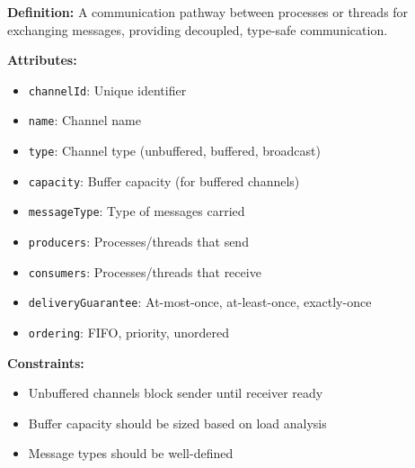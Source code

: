 \documentclass[11pt,letterpaper]{article}
\begin{document}
\begin{definitionbox}
\textbf{Definition:} A communication pathway between processes or threads for exchanging messages, providing decoupled, type-safe communication.

\textbf{Attributes:}
\begin{itemize}[nosep]
    \item \texttt{channelId}: Unique identifier
    \item \texttt{name}: Channel name
    \item \texttt{type}: Channel type (unbuffered, buffered, broadcast)
    \item \texttt{capacity}: Buffer capacity (for buffered channels)
    \item \texttt{messageType}: Type of messages carried
    \item \texttt{producers}: Processes/threads that send
    \item \texttt{consumers}: Processes/threads that receive
    \item \texttt{deliveryGuarantee}: At-most-once, at-least-once, exactly-once
    \item \texttt{ordering}: FIFO, priority, unordered
\end{itemize}

\textbf{Constraints:}
\begin{itemize}[nosep]
    \item Unbuffered channels block sender until receiver ready
    \item Buffer capacity should be sized based on load analysis
    \item Message types should be well-defined
\end{itemize}
\end{definitionbox}
\end{document}

